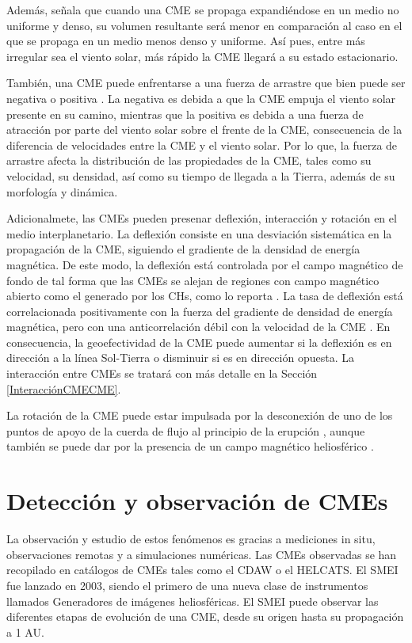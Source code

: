 Además, \textcite[][]{mayank-2023} señala que cuando una CME se propaga  expandiéndose en un medio no uniforme y denso, su volumen resultante será menor en comparación al caso en el que se propaga en un medio menos denso y uniforme. Así pues, entre más irregular sea el viento solar, más rápido la CME llegará a su estado estacionario.

También, una \ac{CME} puede enfrentarse a una fuerza de arrastre que bien puede ser negativa o positiva \textcite[][]{mayank-2023}. La negativa es debida a que la CME empuja el viento solar presente en su camino, mientras que la positiva es debida a una fuerza de atracción por parte del viento solar sobre el frente de la CME, consecuencia de la diferencia de velocidades entre la CME y el viento solar. Por lo que, la fuerza de arrastre afecta la distribución de las propiedades de la CME, tales como su velocidad, su densidad, así como su tiempo de llegada a la Tierra, además de su morfología y dinámica.

Adicionalmete, las CMEs pueden presenar deflexión, interacción y rotación en el medio interplanetario. La deflexión consiste en una desviación sistemática en la propagación de la CME, siguiendo el gradiente de la densidad de energía magnética. De este modo, la deflexión está controlada por el campo magnético de fondo de tal forma que las CMEs se alejan de regiones con campo magnético abierto como el generado por los \acp{CH}, como lo reporta \textcite[e.g.,][]{gopalswamy-2009}. La tasa de deflexión está correlacionada positivamente con la fuerza del gradiente de densidad de energía magnética, pero con una anticorrelación débil con la velocidad de la CME \parencite[e.g.,][]{gui-2011}. En consecuencia, la geoefectividad de la CME puede aumentar si la deflexión es en dirección a la línea Sol-Tierra o disminuir si es en dirección opuesta. La interacción entre CMEs se tratará con más detalle en la Sección \ref{InteracciónCMECME}.

La rotación de la CME puede estar impulsada por la desconexión de uno de los puntos de apoyo de la cuerda de flujo al principio de la erupción \parencite[e.g,][]{vourlidas-2011}, aunque también se puede dar por la presencia de un campo magnético heliosférico \parencite[e.g.,][]{yurchyshyn-2009}.

\section{Detección y observación de CMEs}
La observación y estudio de estos fenómenos es gracias a mediciones in situ, observaciones remotas y a simulaciones numéricas. Las \acp{CME} observadas se han recopilado en catálogos de CMEs tales como el \ac{CDAW} o el \ac{HELCATS}.
El \ac{SMEI} fue lanzado en 2003, siendo el primero de una nueva clase de instrumentos llamados Generadores de imágenes heliosféricas. El \ac{SMEI} puede observar las diferentes etapas de evolución de una CME, desde su origen hasta su propagación a 1 AU.

